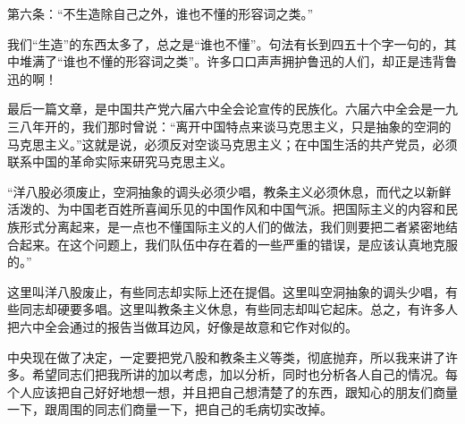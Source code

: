 第六条：“不生造除自己之外，谁也不懂的形容词之类。”

我们“生造”的东西太多了，总之是“谁也不懂”。句法有长到四五十个字一句的，其中堆满了“谁也不懂的形容词之类”。许多口口声声拥护鲁迅的人们，却正是违背鲁迅的啊！

最后一篇文章，是中国共产党六届六中全会论宣传的民族化。六届六中全会是一九三八年开的，我们那时曾说：“离开中国特点来谈马克思主义，只是抽象的空洞的马克思主义。”这就是说，必须反对空谈马克思主义；在中国生活的共产党员，必须联系中国的革命实际来研究马克思主义。

“洋八股必须废止，空洞抽象的调头必须少唱，教条主义必须休息，而代之以新鲜活泼的、为中国老百姓所喜闻乐见的中国作风和中国气派。把国际主义的内容和民族形式分离起来，是一点也不懂国际主义的人们的做法，我们则要把二者紧密地结合起来。在这个问题上，我们队伍中存在着的一些严重的错误，是应该认真地克服的。”

这里叫洋八股废止，有些同志却实际上还在提倡。这里叫空洞抽象的调头少唱，有些同志却硬要多唱。这里叫教条主义休息，有些同志却叫它起床。总之，有许多人把六中全会通过的报告当做耳边风，好像是故意和它作对似的。

中央现在做了决定，一定要把党八股和教条主义等类，彻底抛弃，所以我来讲了许多。希望同志们把我所讲的加以考虑，加以分析，同时也分析各人自己的情况。每个人应该把自己好好地想一想，并且把自己想清楚了的东西，跟知心的朋友们商量一下，跟周围的同志们商量一下，把自己的毛病切实改掉。


